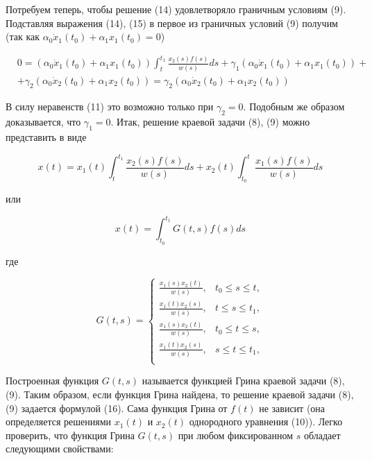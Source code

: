 \documentclass{article}
\theoremstyle{plain} \newtheorem*{theorem*}{Теорема}
\theoremstyle{plain} \newtheorem{theorem}{Теорема}[section]
\theoremstyle{defintition} \newtheorem*{corollary*}{Следствие}
\theoremstyle{remark} \newtheorem*{example*}{Пример}
\theoremstyle{remark} \newtheorem*{remark*}{Замечание}
\begin{document}
Потребуем теперь, чтобы решение (14) удовлетворяло
граничным условиям (9). Подставляя выражения (14), (15)
в первое из граничных условий (9) получим
(так как $\alpha_0 \dot{x}_1(t_0) + \alpha_1 x_1(t_0) = 0$)

\begin{align*}
    & 0 =
    (\alpha_0 \dot{x}_1(t_0) + \alpha_1 x_1(t_0))
    \int^{t_1}_t \frac{x_2(s)f(s)}{w(s)} ds +
    \gamma_1
    (\alpha_0 \dot{x}_1(t_0) + \alpha_1 x_1(t_0)) + \\
    & + \gamma_2(\alpha_0 \dot{x}_2(t_0) + \alpha_1 x_2(t_0)) =
    \gamma_2(\alpha_0 \dot{x}_2(t_0) + \alpha_1 x_2(t_0))
\end{align*}

В силу  неравенств (11) это возможно только при $\gamma_2 = 0$.
Подобным же образом доказывается, что $\gamma_1 = 0$.
Итак, решение краевой задачи (8), (9) можно
представить в виде

\begin{equation*}
    x(t) =
    x_1(t)\int^{t_1}_t \frac{x_2(s)f(s)}{w(s)} ds +
    x_2(t)\int^t_{t_0} \frac{x_1(s)f(s)}{w(s)} ds
\end{equation*}

или

\begin{equation}
    x(t) = \int^{t_1}_{t_0} G(t, s) f(s) ds
\end{equation}

где

\begin{equation}
    G(t,s) =
    \begin{cases}
        \frac{x_1(s) x_2(t)}{w(s)} , &t_0 \le s \le t,\\
        \frac{x_1(t) x_2(s)}{w(s)} , &t \le s \le t_1,\\
        \frac{x_1(s) x_2(t)}{w(s)} , &t_0 \le t \le s,\\
        \frac{x_1(t) x_2(s)}{w(s)} , &s \le t \le t_1,\\
    \end{cases}
\end{equation}

Построенная функция $G(t,s)$ называется функцией Грина
краевой задачи (8), (9). Таким образом, если функция
Грина найдена, то решение краевой задачи (8), (9) задается
формулой (16). Сама функция Грина от $f(t)$ не зависит
(она определяется решениями $x_1(t)$ и $x_2(t)$ однородного
уравнения (10)).
Легко проверить, что функция Грина $G(t,s)$ при любом
фиксированном $s$ обладает следующими свойствами:
\end{document}
